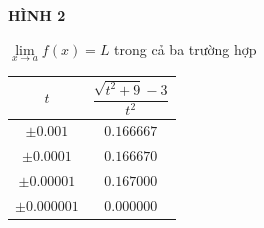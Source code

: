 \noindent
\begin{minipage}[t]{0.27\textwidth}
    \vspace{0pt}
    \raggedright
    \textbf{\textsf{HÌNH 2}}\par
    \vspace{2pt}
    $\lim\limits_{x \to a} f(x) = L$ trong cả ba trường hợp

    \vspace{7.2cm}
    \begin{center}
    \renewcommand{\arraystretch}{1.25}
    \small
    \begin{tabular}{|c|c|}
    \hline
    \rowcolor{stewarttablehead}
    $t$ & $\dfrac{\sqrt{t^2 + 9} - 3}{t^2}$ \\
    \hline
    $\pm 0.001$ & $0.166667$ \\
    $\pm 0.0001$ & $0.166670$ \\
    $\pm 0.00001$ & $0.167000$ \\
    $\pm 0.000001$ & $0.000000$ \\
    \hline
    \end{tabular}
    \end{center}
\end{minipage}%
\hfill
